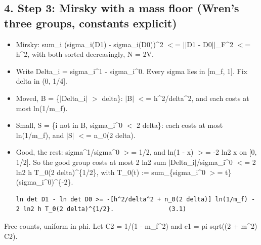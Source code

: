 \documentclass[11pt,a4paper]{article}
\begin{document}
\subsection*{4. Step 3: Mirsky with a mass floor (Wren's three groups, constants explicit)}
\begin{itemize}
\item{} Mirsky: sum\_i (sigma\_i(D1) - sigma\_i(D0))\textasciicircum{}2 $<$= $|$$|$D1 - D0$|$$|$\_F\textasciicircum{}2 $<$= h\textasciicircum{}2, with both sorted decreasingly, N = 2V.
\item{} Write Delta\_i = sigma\_i\textasciicircum{}1 - sigma\_i\textasciicircum{}0. Every sigma lies in [m\_f, 1]. Fix delta in (0, 1/4].
\item{} Moved, B = \{$|$Delta\_i$|$ $>$ delta\}: $|$B$|$ $<$= h\textasciicircum{}2/delta\textasciicircum{}2, and each costs at most ln(1/m\_f).
\item{} Small, S = \{i not in B, sigma\_i\textasciicircum{}0 $<$ 2 delta\}: each costs at most ln(1/m\_f), and $|$S$|$ $<$= n\_0(2 delta).
\item{} Good, the rest: sigma\textasciicircum{}1/sigma\textasciicircum{}0 $>$= 1/2, and ln(1 - x) $>$= -2 ln2 x on [0, 1/2]. So the good group costs at most
2 ln2 sum $|$Delta\_i$|$/sigma\_i\textasciicircum{}0 $<$= 2 ln2 h T\_0(2 delta)\textasciicircum{}\{1/2\}, with T\_0(t) := sum\_\{sigma\_i\textasciicircum{}0 $>$= t\} (sigma\_i\textasciicircum{}0)\textasciicircum{}\{-2\}.
\begin{Verbatim}[breaklines=true,breakanywhere=true,fontsize=\small]
ln det D1 - ln det D0 >= -[h^2/delta^2 + n_0(2 delta)] ln(1/m_f) - 2 ln2 h T_0(2 delta)^{1/2}.               (3.1)
\end{Verbatim}

\end{itemize}

Free counts, uniform in phi. Let C2 = 1/(1 - m\_f\textasciicircum{}2) and c1 = pi sqrt((2 + m\textasciicircum{}2) C2).
\end{document}
